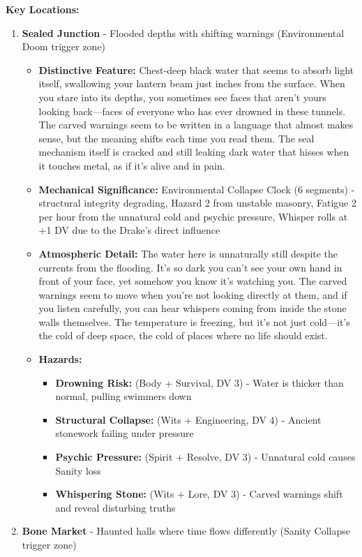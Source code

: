 \documentclass[11pt]{article}
\begin{document}
\textbf{Key Locations:}
\begin{enumerate}
\item \textbf{Sealed Junction} - Flooded depths with shifting warnings (Environmental Doom trigger zone)
  \begin{itemize}
  \item \textbf{Distinctive Feature:} Chest-deep black water that seems to absorb light itself, swallowing your lantern beam just inches from the surface. When you stare into its depths, you sometimes see faces that aren't yours looking back—faces of everyone who has ever drowned in these tunnels. The carved warnings seem to be written in a language that almost makes sense, but the meaning shifts each time you read them. The seal mechanism itself is cracked and still leaking dark water that hisses when it touches metal, as if it's alive and in pain.
  \item \textbf{Mechanical Significance:} Environmental Collapse Clock (6 segments) - structural integrity degrading, Hazard 2 from unstable masonry, Fatigue 2 per hour from the unnatural cold and psychic pressure, Whisper rolls at +1 DV due to the Drake's direct influence
  \item \textbf{Atmospheric Detail:} The water here is unnaturally still despite the currents from the flooding. It's so dark you can't see your own hand in front of your face, yet somehow you know it's watching you. The carved warnings seem to move when you're not looking directly at them, and if you listen carefully, you can hear whispers coming from inside the stone walls themselves. The temperature is freezing, but it's not just cold—it's the cold of deep space, the cold of places where no life should exist.
  \item \textbf{Hazards:}
    \begin{itemize}
    \item \textbf{Drowning Risk:} (Body + Survival, DV 3) - Water is thicker than normal, pulling swimmers down
    \item \textbf{Structural Collapse:} (Wits + Engineering, DV 4) - Ancient stonework failing under pressure
    \item \textbf{Psychic Pressure:} (Spirit + Resolve, DV 3) - Unnatural cold causes Sanity loss
    \item \textbf{Whispering Stone:} (Wits + Lore, DV 3) - Carved warnings shift and reveal disturbing truths
    \end{itemize}
  \end{itemize}
\item \textbf{Bone Market} - Haunted halls where time flows differently (Sanity Collapse trigger zone)

\end{enumerate}
\end{document}
